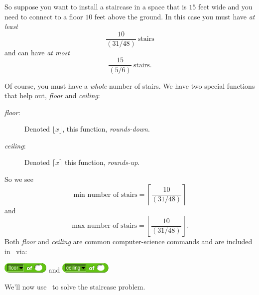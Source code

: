 \documentclass[noauthor,nooutcomes,12pt,handout]{ximera}
\begin{document}
So suppose you want to install a staircase in a space that is $15$
feet wide and you need to connect to a floor $10$ feet above the
ground. In this case you must have \emph{at least}
\[
\frac{10}{\left(31/48\right)} \ \text{stairs}
\]
and can have \emph{at most}
\[
\frac{15}{\left(5/6\right)} \ \text{stairs}.
\]


Of course, you must have a \emph{whole} number of stairs. We have two special functions that help out, \emph{floor} and \emph{ceiling}:
\begin{description}
\item[\emph{floor}:] Denoted $\lfloor x\rfloor$, this function, \emph{rounds-down}.
\item[\emph{ceiling}:] Denoted $\lceil x\rceil$ this function, \emph{rounds-up}.
\end{description}
So we see
\[
\text{min number of stairs} = \left\lceil \frac{10}{\left(31/48\right)} \right\rceil
\]
and
\[
\text{max number of stairs} = \left\lfloor \frac{10}{\left(31/48\right)} \right\rfloor.
\]
Both \emph{floor} and \emph{ceiling} are common computer-science
commands and are included in \snap\ via:
\begin{center}
  \includegraphics{floor-script.png}
  \qquad
  and
  \qquad
\includegraphics{ceiling-script.png}
\end{center}
We'll now use \snap\ to solve the staircase problem.

\mynewpage
\end{document}
